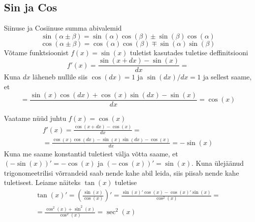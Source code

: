 \documentclass[a4paper,11pt,twocolumn]{article}
\begin{document}
\subsection{Sin ja Cos}
Siinuse ja Cosiinuse summa abivalemid
\begin{equation*}
\sin(\alpha\pm\beta) = \sin(\alpha)\cos(\beta)\pm\sin(\beta)\cos(\alpha)
\end{equation*}
\begin{equation*}
\cos(\alpha\pm\beta) = \cos(\alpha)\cos(\beta)\mp\sin(\alpha)\sin(\beta)
\end{equation*}
Võtame funktsioonist $f(x) = \sin(x)$ tuletist kasutades tuletise deffinitsiooni
\begin{equation*}
f'(x) = \frac{\sin(x+dx)-\sin(x)}{dx} =
\end{equation*}
Kuna $dx$ läheneb nullile siis $\cos(dx) = 1$ ja $\sin(dx)/dx=1$ ja sellest saame, et 
\begin{equation*}
= \frac{\sin(x)\cos(dx)+\cos(x)\sin(dx)-\sin(x)}{dx} = \cos(x)
\end{equation*}

Vaatame nüüd juhtu $f(x) = \cos(x)$
\begin{multline*}
f'(x) = \frac{\cos(x+dx)-\cos(x)}{dx} = \\
= \frac{\cos(x)\cos(dx) - \sin(x)\sin(dx) - \cos(x)}{dx} = -\sin(x)
\end{multline*}
Kuna me saame konstantid tuletiest välja võtta saame, et $(-\sin(x))' = -\cos(x)$ ja $(-\cos(x))' = \sin(x)$. Kuna ülejäänud trigonomeetrilisi võrrandeid saab nende kahe abil leida, siis piisab nende kahe tuletisest. Leiame näiteks $\tan(x)$ tuletise
\begin{multline*}
\tan(x)'=(\frac{\sin(x)}{\cos(x)})'  = \frac{\sin(x)'\cos(x)-\cos(x)'\sin(x)}{\cos^2(x)}=\\
=\frac{\cos^2(x) + \sin^2(x)}{\cos^2(x)} = \sec^2(x)
\end{multline*}
\end{document}
